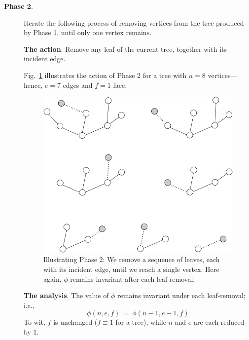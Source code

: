\begin{description}
\smallskip

\item[{\bf Phase 2}.]
Iterate the following process of removing vertices from the tree produced
by Phase 1, until only one vertex remains.

\bigskip

{\bf The action}.
Remove any leaf of the current tree, together with its incident edge.

Fig.~\ref{fig:planarStep2} illustrates the action of Phase  2
for a tree  with $n=8$ vertices---hence, $e=7$ edges and $f=1$ face.
\begin{figure}[hbt]
\begin{center}
   \includegraphics[scale=0.35]{FiguresGraph/planarStep2}
   \caption{Illustrating Phase 2: We remove a sequence of leaves, each
     with its incident edge, until we reach a single vertex.  Here again,
     $\phi$ remains invariant after each leaf-removal.}
  \label{fig:planarStep2}
\end{center}
\end{figure}

\bigskip

{\bf The analysis}.
The value of $\phi$ remains invariant under each leaf-removal; i.e.,
\[ \phi(n,e,f) \ = \ \phi(n-1,e-1,f) \]
To wit, $f$ is unchanged ($f \equiv 1$ for a tree), while $n$ and $e$ are
each reduced by $1$.
\end{description}

\medskip

